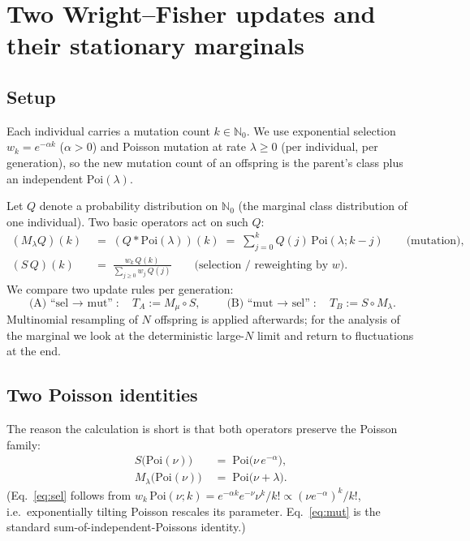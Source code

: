\documentclass[11pt]{article}
\newcommand{\Poi}{\mathrm{Poi}}
\newcommand{\NN}{\mathbb{N}_0}
\begin{document}
\section*{Two Wright--Fisher updates and their stationary marginals}

\subsection*{Setup}
Each individual carries a mutation count $k\in\NN$. We use exponential
selection $w_k = e^{-\alpha k}$ ($\alpha>0$) and Poisson mutation at rate
$\lambda\ge 0$ (per individual, per generation), so the new mutation count of an
offspring is the parent's class plus an independent $\Poi(\lambda)$.

Let $Q$ denote a probability distribution on $\NN$ (the marginal class
distribution of one individual). Two basic operators act on such $Q$:
\begin{align*}
  (M_\lambda Q)(k) &\;=\;(Q\ast\Poi(\lambda))(k)
                \;=\;\sum_{j=0}^{k} Q(j)\,\Poi(\lambda;k-j)
                \qquad\text{(mutation)},\\
  (S\,Q)(k)     &\;=\;\frac{w_k\,Q(k)}{\sum_{j\ge 0} w_j\,Q(j)}
                \qquad\text{(selection / reweighting by $w$).}
\end{align*}
We compare two update rules per generation:
\[
  \text{(A) ``sel $\to$ mut''}:\quad T_A := M_\mu\circ S,
  \qquad
  \text{(B) ``mut $\to$ sel''}:\quad T_B := S\circ M_\lambda.
\]
Multinomial resampling of $N$ offspring is applied afterwards; for the
analysis of the marginal we look at the deterministic large-$N$ limit and
return to fluctuations at the end.

\subsection*{Two Poisson identities}
The reason the calculation is short is that both operators preserve the
Poisson family:
\begin{align}
  S\bigl(\Poi(\nu)\bigr)         &\;=\;\Poi\bigl(\nu\,e^{-\alpha}\bigr),
  \label{eq:sel}\\
  M_\lambda\bigl(\Poi(\nu)\bigr)    &\;=\;\Poi\bigl(\nu+\lambda\bigr).
  \label{eq:mut}
\end{align}
(Eq.~\eqref{eq:sel} follows from
$w_k\,\Poi(\nu;k)=e^{-\alpha k}e^{-\nu}\nu^k/k!\propto(\nu e^{-\alpha})^k/k!$,
i.e.~exponentially tilting Poisson rescales its parameter.
Eq.~\eqref{eq:mut} is the standard sum-of-independent-Poissons identity.)
\end{document}
